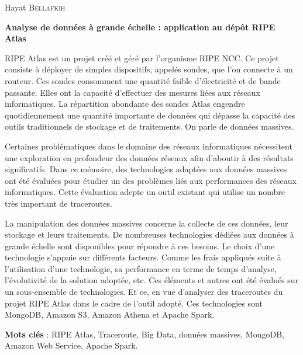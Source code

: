 \documentclass[]{report}
\title{}
\author{}
\begin{document}
\begin{center}
	Hayat  \textsc{Bellafkih}
\end{center}
\vspace{5mm}

\begin{center}
\textbf{Analyse de données à grande échelle : application au dépôt RIPE Atlas}
\end{center}




\vspace{15mm}
RIPE Atlas est un projet créé et géré par l'organisme RIPE NCC.  Ce projet consiste  à déployer de
simples dispositifs, appelés sondes, que l'on  connecte à un routeur. Ces sondes consomment une quantité
faible d'électricité et de bande passante. Elles ont la capacité d'effectuer des mesures liées aux réseaux informatiques.
La répartition abondante des sondes Atlas engendre quotidiennement une quantité importante
de données qui dépasse la capacité des outils traditionnels de stockage et de traitements. On parle de données massives. 

Certaines problématiques dans le domaine des réseaux
informatiques nécessitent une exploration en profondeur des données réseaux afin d'aboutir à des
résultats significatifs. Dans ce mémoire, des technologies adaptées aux données massives ont été évaluées pour étudier un des problèmes liés aux performances des réseaux informatiques. Cette  évaluation adepte un outil existant qui utilise    un nombre très important de traceroutes. 


La manipulation des données massives concerne la collecte de ces données, leur stockage et leurs traitements. De nombreuses  technologies dédiées aux données à grande échelle  sont disponibles pour répondre à ces besoins. Le choix d'une technologie s'appuie sur différents facteurs. Comme les frais appliqués suite à l'utilisation d'une technologie, sa performance en terme de temps d'analyse, l'évolutivité de la solution adoptée, etc. Ces  éléments  et autres ont été évalués sur un sous-ensemble de technologies. Et ce, en vue d'analyser des traceroutes du projet RIPE Atlas dans le cadre de l'outil adopté. Ces technologies sont MongoDB, Amazon S3, Amazon Athena et Apache Spark.






\textbf{Mots clés} : RIPE Atlas, Traceroute,  Big Data, données massives, MongoDB, Amazon Web Service, Apache Spark.
\end{document}
